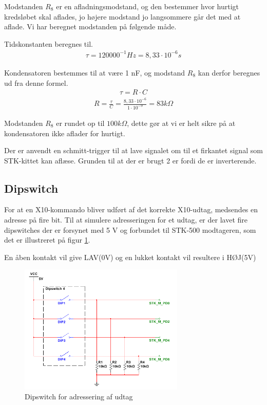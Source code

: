 Modstanden $R_8$ er en afladningsmodstand, og den bestemmer hvor hurtigt kredsløbet skal aflades, jo højere modstand jo langsommere går det med at aflade. Vi har beregnet modstanden på følgende måde.

Tidskonstanten beregnes til.
\begin{align}
\tau = 120000^{-1} Hz = 8,33 \cdot 10^{-6} s
\end{align}


Kondensatoren bestemmes til at være 1 nF, og modstand $R_8$ kan derfor beregnes ud fra denne formel.
\begin{align}
\tau = R \cdot C 
\end{align}
\begin{align}
R = \frac{\tau}{C} = \frac{8,33 \cdot 10^{-6}}{1 \cdot 10^{-9}} = 83 k\Omega
\end{align}

Modstanden $R_8$ er rundet op til $100 k\Omega$, dette gør at vi er helt sikre på at kondensatoren ikke aflader for hurtigt. 

Der er anvendt en schmitt-trigger til at lave signalet om til et firkantet signal som STK-kittet kan aflæse. Grunden til at der er brugt 2 er fordi de er inverterende. 

\newpage
\subsection{Dipswitch}
For at en X10-kommando bliver udført af det korrekte X10-udtag, medsendes en adresse på fire bit.
Til at simulere adresseringen for et udtag, er der lavet fire dipswitches der er forsynet med 5 V og forbundet til STK-500 modtageren, som det er illustreret på figur \ref{fig:DIPSWITCH}.

En åben kontakt vil give LAV(0V) og en lukket kontakt vil resultere i HØJ(5V)

\begin{figure}[htbp]
	\centering
	\includegraphics[width=0.70\textwidth]{billeder/HWdesign/DIPSWITCH}
	\caption{Dipswitch for adressering af udtag}
	\label{fig:DIPSWITCH}
\end{figure}


